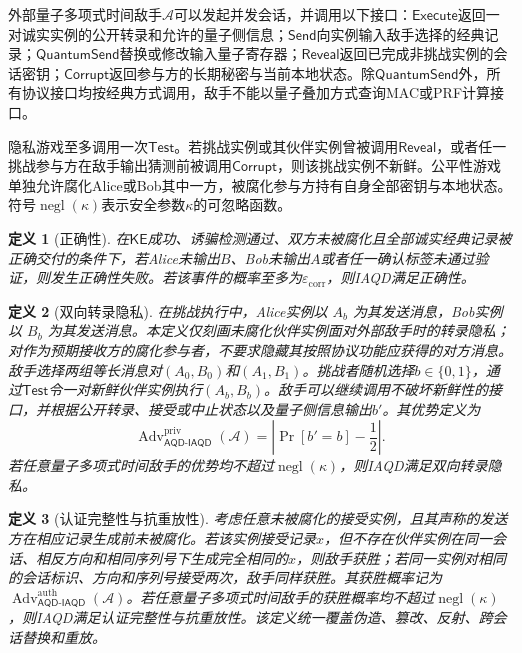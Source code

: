 \documentclass[UTF8,10pt,a4paper]{ctexart}
\theoremstyle{aqdplain}
\newtheorem{definition}{定义}
\newcommand{\negl}{\operatorname{negl}}
\newcommand{\Adv}{\operatorname{Adv}}
\newcommand{\Prb}{\Pr}
\newcommand{\prot}{\mathsf{AQD\mbox{-}IAQD}}
\begin{document}
外部量子多项式时间敌手$\mathcal A$可以发起并发会话，并调用以下接口：$\mathsf{Execute}$返回一对诚实实例的公开转录和允许的量子侧信息；$\mathsf{Send}$向实例输入敌手选择的经典记录；$\mathsf{QuantumSend}$替换或修改输入量子寄存器；$\mathsf{Reveal}$返回已完成非挑战实例的会话密钥；$\mathsf{Corrupt}$返回参与方的长期秘密与当前本地状态。除$\mathsf{QuantumSend}$外，所有协议接口均按经典方式调用，敌手不能以量子叠加方式查询MAC或PRF计算接口。

隐私游戏至多调用一次$\mathsf{Test}$。若挑战实例或其伙伴实例曾被调用$\mathsf{Reveal}$，或者任一挑战参与方在敌手输出猜测前被调用$\mathsf{Corrupt}$，则该挑战实例不新鲜。公平性游戏单独允许腐化Alice或Bob其中一方，被腐化参与方持有自身全部密钥与本地状态。符号$\negl(\kappa)$表示安全参数$\kappa$的可忽略函数。

\begin{definition}[正确性]
在$\mathsf{KE}$成功、诱骗检测通过、双方未被腐化且全部诚实经典记录被正确交付的条件下，若Alice未输出$B$、Bob未输出$A$或者任一确认标签未通过验证，则发生正确性失败。若该事件的概率至多为$\varepsilon_{\mathrm{corr}}$，则IAQD满足正确性。
\end{definition}

\begin{definition}[双向转录隐私]
在挑战执行中，Alice实例以 \(A_b\) 为其发送消息，Bob实例以 \(B_b\) 为其发送消息。本定义仅刻画未腐化伙伴实例面对外部敌手时的转录隐私；对作为预期接收方的腐化参与者，不要求隐藏其按照协议功能应获得的对方消息。敌手选择两组等长消息对$(A_0,B_0)$和$(A_1,B_1)$。挑战者随机选择$b\in\{0,1\}$，通过$\mathsf{Test}$令一对新鲜伙伴实例执行$(A_b,B_b)$。敌手可以继续调用不破坏新鲜性的接口，并根据公开转录、接受或中止状态以及量子侧信息输出$b'$。其优势定义为
\begin{equation}
\Adv_{\prot}^{\mathrm{priv}}(\mathcal A)=
\left|\Prb[b'=b]-\frac12\right|.
\label{eq:privacyadv}
\end{equation}
若任意量子多项式时间敌手的优势均不超过$\negl(\kappa)$，则IAQD满足双向转录隐私。
\end{definition}

\begin{definition}[认证完整性与抗重放性]
考虑任意未被腐化的接受实例，且其声称的发送方在相应记录生成前未被腐化。若该实例接受记录$x$，但不存在伙伴实例在同一会话、相反方向和相同序列号下生成完全相同的$x$，则敌手获胜；若同一实例对相同的会话标识、方向和序列号接受两次，敌手同样获胜。其获胜概率记为$\Adv_{\prot}^{\mathrm{auth}}(\mathcal A)$。若任意量子多项式时间敌手的获胜概率均不超过$\negl(\kappa)$，则IAQD满足认证完整性与抗重放性。该定义统一覆盖伪造、篡改、反射、跨会话替换和重放。
\end{definition}
\end{document}
